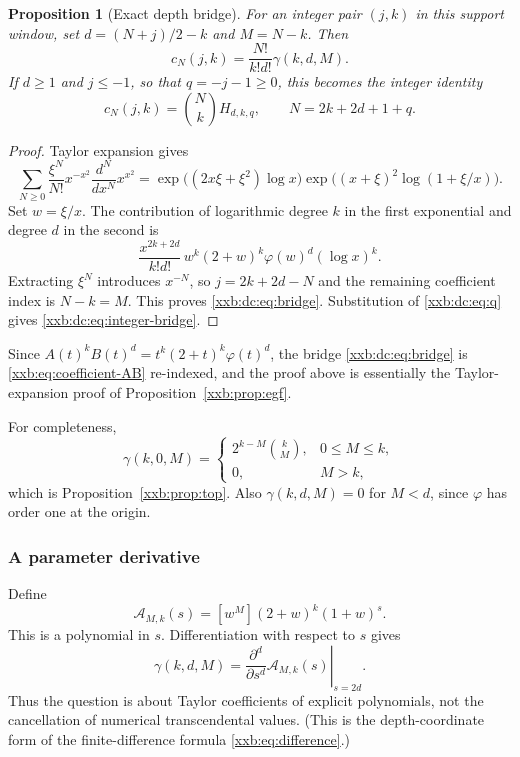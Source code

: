 \documentclass[11pt,a4paper]{article}
\numberwithin{equation}{section}
\newtheorem{proposition}[theorem]{Proposition}
\theoremstyle{definition}
\theoremstyle{remark}
\theoremstyle{plain}
\begin{document}
\begin{proposition}[Exact depth bridge]\label{xxb:dc:prop:bridge}
For an integer pair $(j,k)$ in this support window, set
$d=(N+j)/2-k$ and $M=N-k$.  Then
\begin{equation}\label{xxb:dc:eq:bridge}
 c_N(j,k)=\frac{N!}{k!d!}\gamma(k,d,M).
\end{equation}
If $d\ge1$ and $j\le-1$, so that $q=-j-1\ge0$, this becomes the
integer identity
\begin{equation}\label{xxb:dc:eq:integer-bridge}
 c_N(j,k)=\binom Nk H_{d,k,q},\qquad
 N=2k+2d+1+q.
\end{equation}
\end{proposition}
\begin{proof}
Taylor expansion gives
\[
 \sum_{N\ge0}\frac{\xi^N}{N!}x^{-x^2}\frac{d^N}{dx^N}x^{x^2}
 =\exp\bigl((2x\xi+\xi^2)\log x\bigr)
  \exp\bigl((x+\xi)^2\log(1+\xi/x)\bigr).
\]
Set $w=\xi/x$.  The contribution of logarithmic degree $k$ in the first
exponential and degree $d$ in the second is
\[
 \frac{x^{2k+2d}}{k!d!}\,w^k(2+w)^k\varphi(w)^d(\log x)^k.
\]
Extracting $\xi^N$ introduces $x^{-N}$, so $j=2k+2d-N$ and the remaining
coefficient index is $N-k=M$.  This proves \eqref{xxb:dc:eq:bridge}.
Substitution of \eqref{xxb:dc:eq:q} gives \eqref{xxb:dc:eq:integer-bridge}.
\end{proof}

Since $A(t)^kB(t)^d=t^k(2+t)^k\varphi(t)^d$, the bridge
\eqref{xxb:dc:eq:bridge} is \eqref{xxb:eq:coefficient-AB} re-indexed, and the
proof above is essentially the Taylor-expansion proof of
Proposition~\ref{xxb:prop:egf}.

For completeness,
\begin{equation}\label{xxb:dc:eq:d0}
 \gamma(k,0,M)=
 \begin{cases}2^{k-M}\binom{k}{M},&0\le M\le k,\\0,&M>k,\end{cases}
\end{equation}
which is Proposition~\ref{xxb:prop:top}.  Also $\gamma(k,d,M)=0$ for $M<d$,
since $\varphi$ has order one at the origin.

\subsubsection{A parameter derivative}
Define
\[
 \mathcal A_{M,k}(s)=[w^M](2+w)^k(1+w)^s.
\]
This is a polynomial in $s$.  Differentiation with respect to $s$ gives
\begin{equation}\label{xxb:dc:eq:param}
 \gamma(k,d,M)=\left.\frac{\partial^d}{\partial s^d}\mathcal A_{M,k}(s)\right|_{s=2d}.
\end{equation}
Thus the question is about Taylor coefficients of explicit polynomials,
not the cancellation of numerical transcendental values.  (This is the
depth-coordinate form of the finite-difference formula
\eqref{xxb:eq:difference}.)
\end{document}

